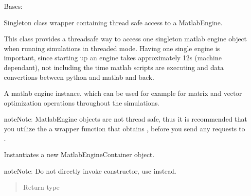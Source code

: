 \documentclass[letterpaper,10pt,english]{sphinxmanual}
\begin{document}
\begin{fulllineitems}
\label{\detokenize{app.domain.helpers:app.domain.helpers.matlab_utils.MatlabEngineContainer}}
Bases: 

Singleton class wrapper containing thread safe access to a MatlabEngine.

This class provides a thread\sphinxhyphen{}safe way to access one singleton
matlab engine object when running simulations in threaded mode. Having
one single engine is important, since starting up an engine takes
approximately 12s (machine dependant), not including the time matlab
scripts are executing and data convertions between python and matlab and
back.

\begin{fulllineitems}
\label{\detokenize{app.domain.helpers:app.domain.helpers.matlab_utils.MatlabEngineContainer.eng}}
A matlab engine instance, which can be used for example for matrix
and vector optimization operations throughout the simulations.

\begin{sphinxadmonition}{note}{Note:}
MatlabEngine objects are not thread safe, thus it
is recommended that you utilize  the a wrapper function that
obtains {\hyperref[\detokenize{app.domain.helpers:app.domain.helpers.matlab_utils.MatlabEngineContainer._LOCK}]{}}, before you send any requests to
.
\end{sphinxadmonition}

\end{fulllineitems}


\begin{fulllineitems}
\label{\detokenize{app.domain.helpers:app.domain.helpers.matlab_utils.MatlabEngineContainer.__init__}}
Instantiates a new MatlabEngineContainer object.

\begin{sphinxadmonition}{note}{Note:}
Do not directly invoke constructor, use {\hyperref[\detokenize{app.domain.helpers:app.domain.helpers.matlab_utils.MatlabEngineContainer.get_instance}]{}}
instead.
\end{sphinxadmonition}
\begin{quote}\begin{description}
\item[{Return type}] \leavevmode
{}


\end{description}
\end{quote}
\end{fulllineitems}
\end{fulllineitems}
\end{document}
